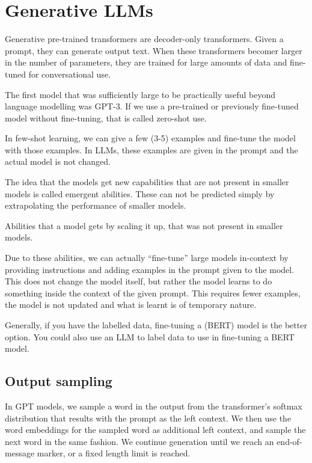 \section{Generative LLMs}

Generative pre-trained transformers are decoder-only transformers.
Given a prompt, they can generate output text. When these transformers
becomer larger in the number of parameters, they are trained for large amounts
of data and fine-tuned for conversational use.

The first model that was sufficiently large to be practically useful
beyond language
modelling was GPT-3. If we use a pre-trained or previously fine-tuned
model without
fine-tuning, that is called zero-shot use.

In few-shot learning, we can give a few (3-5) examples and fine-tune the
model with those examples. In LLMs, these examples are given in the prompt
and the actual model is not changed.

The idea that the models get new capabilities that are not present in
smaller models is called emergent abilities. These can not be predicted
simply by extrapolating the performance of smaller models.

\begin{definition}
  Abilities that a model gets by scaling it up, that was not present
  in smaller models.
\end{definition}

Due to these abilities, we can actually ``fine-tune'' large models in-context
by providing instructions and adding examples in the prompt given to the model.
This does not change the model itself, but rather the model learns to
do something
inside the context of the given prompt. This requires fewer examples,
the model is not
updated and what is learnt is of temporary nature.

Generally, if you have the labelled data, fine-tuning a (BERT) model
is the better
option. You could also use an LLM to label data to use in fine-tuning
a BERT model.

\subsection{Output sampling}

In GPT models, we sample a word in the output from the transformer's
softmax distribution
that results with the prompt as the left context. We then use the
word embeddings
for the sampled word as additional left context, and sample the next word in the
same fashion. We continue generation until we reach an end-of-message
marker, or a
fixed length limit is reached.

